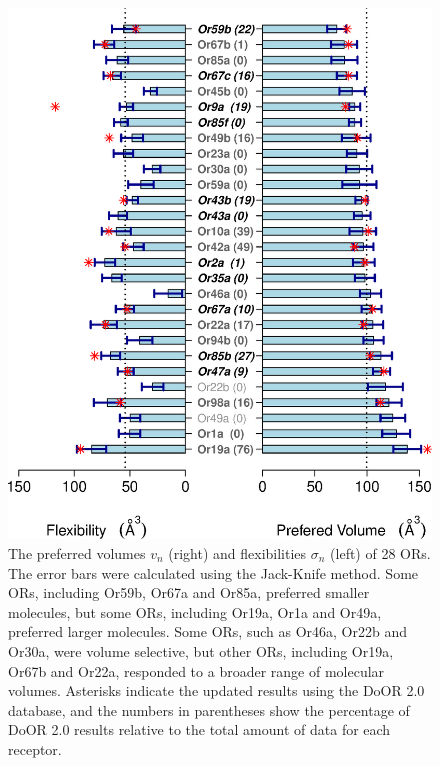 \documentclass[fleqn,11pt]{wlscirep}
\newcommand{\numberofreceptors}{ 28 }
\begin{document}
\begin{figure}
		\centering
		\includegraphics[height=  \textwidth]{mean-std-vol-}
	\caption{The preferred volumes $v_n$ (right) 
		and flexibilities $\sigma_n$ (left) of \numberofreceptors ORs. 
		The error bars were calculated using the Jack-Knife method. 
		Some ORs, including Or59b, Or67a and Or85a, preferred smaller molecules, 
		but some ORs, including Or19a, Or1a and Or49a, preferred larger molecules.
		Some ORs, such as Or46a, Or22b and Or30a, were volume selective, 
		but other ORs, including Or19a, Or67b and Or22a, responded to a broader range of molecular volumes.
		Asterisks indicate the updated results using the DoOR 2.0 database, 
		and the numbers in  parentheses show the percentage of DoOR 2.0 results relative to the total amount of data for each receptor.
		}
		\label{fig:preferred_volume}
\end{figure}
\end{document}
